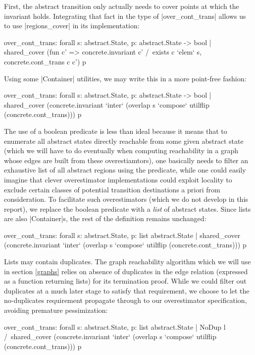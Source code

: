 \documentclass[runningheads]{llncs}
\begin{document}
First, the abstract transition only actually needs to cover points at which the invariant holds. Integrating that fact in the type of |over_cont_trans| allows us to use |regions_cover| in its implementation:
\begin{code}
over_cont_trans: forall s: abstract.State,
  { p: abstract.State -> bool | shared_cover
    (fun c' => concrete.invariant c' /\ exists c `elem` s, concrete.cont_trans c c') p }
\end{code}
Using some |Container| utilities, we may write this in a more point-free fashion:
\begin{code}
over_cont_trans: forall s: abstract.State,
  { p: abstract.State -> bool | shared_cover
    (concrete.invariant `inter` (overlap s `compose` utilflip (concrete.cont_trans))) p }
\end{code}
The use of a boolean predicate is less than ideal because it means that to enumerate all abstract states directly reachable from some given abstract state (which we will have to do eventually when computing reachability in a graph whose edges are built from these overestiamtors), one basically needs to filter an exhaustive list of all abstract regions using the predicate, while one could easily imagine that clever overestimator implementations could exploit locality to exclude certain classes of potential transition destinations a priori from consideration. To facilitate such overestimators (which we do not develop in this report), we replace the boolean predicate with a \emph{list} of abstract states. Since lists are also |Container|s, the rest of the definition remains unchanged:
\begin{code}
over_cont_trans: forall s: abstract.State,
  { p: list abstract.State | shared_cover
    (concrete.invariant `inter` (overlap s `compose` utilflip (concrete.cont_trans))) p }
\end{code}
Lists may contain duplicates. The graph reachability algorithm which we will use in section \ref{graphs} relies on absence of duplicates in the edge relation (expressed as a function returning lists) for its termination proof. While we could filter out duplicates at a much later stage to satisfy that requirement, we choose to let the no-duplicates requirement propagate through to our overestimator specification, avoiding premature pessimization:
\begin{code}
over_cont_trans: forall s: abstract.State,
  { p: list abstract.State | NoDup l /\ shared_cover
    (concrete.invariant `inter` (overlap s `compose` utilflip (concrete.cont_trans))) p }
\end{code}
\end{document}
